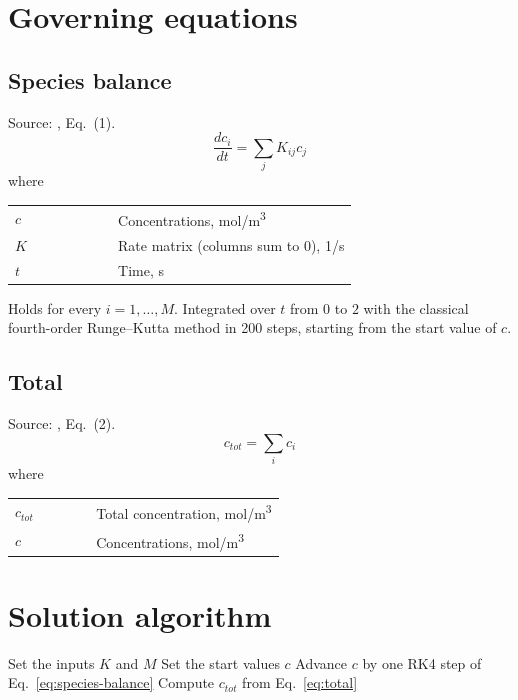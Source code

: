 \section{Governing equations}

\subsection{Species balance}
Source: \cite{ref}, Eq.~(1).
\begin{equation}
  \frac{dc_i}{dt} = \sum_j K_{ij} c_j
  \label{eq:species-balance}
\end{equation}
\noindent where

\noindent\begin{tabular}{@{\quad}l@{\quad}p{0.7\linewidth}@{}}
  $c$ & Concentrations, \si{mol/m^{3}} \\
  $K$ & Rate matrix (columns sum to 0), \si{1/s} \\
  $t$ & Time, \si{s} \\
\end{tabular}

\noindent Holds for every $i = 1, \dots, M$. Integrated over $t$ from $0$ to $2$ with the classical fourth-order Runge–Kutta method in 200 steps, starting from the start value of $c$.

\subsection{Total}
Source: \cite{ref}, Eq.~(2).
\begin{equation}
  c_{tot} = \sum_i c_i
  \label{eq:total}
\end{equation}
\noindent where

\noindent\begin{tabular}{@{\quad}l@{\quad}p{0.7\linewidth}@{}}
  $c_{tot}$ & Total concentration, \si{mol/m^{3}} \\
  $c$ & Concentrations, \si{mol/m^{3}} \\
\end{tabular}


\section{Solution algorithm}
\begin{algorithm}[htbp]
  \caption{Solution procedure}\label{alg:solution}
  \begin{algorithmic}[1]
    \State Set the inputs $K$ and $M$
    \State Set the start values $c$
     
      \State Advance $c$ by one RK4 step of Eq.~\eqref{eq:species-balance}
    \EndFor
    \State Compute $c_{tot}$ from Eq.~\eqref{eq:total}
  \end{algorithmic}
\end{algorithm}

